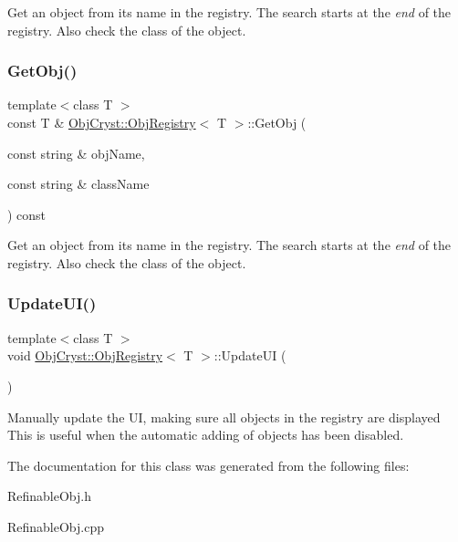 Get an object from its name in the registry. The search starts at the {\itshape end} of the registry. Also check the class of the object. \mbox{\label{class_obj_cryst_1_1_obj_registry_a1c6961905c0f6009b09dd6d79cabfbfa}} 
\subsubsection{\texorpdfstring{GetObj()}{GetObj()}\hspace{0.1cm}{\footnotesize\ttfamily [6/6]}}
{\footnotesize\ttfamily template$<$class T $>$ \\
const T \& \mbox{\hyperlink{class_obj_cryst_1_1_obj_registry}{Obj\+Cryst\+::\+Obj\+Registry}}$<$ T $>$\+::Get\+Obj (\begin{DoxyParamCaption}\item[{const string \&}]{obj\+Name,  }\item[{const string \&}]{class\+Name }\end{DoxyParamCaption}) const}

Get an object from its name in the registry. The search starts at the {\itshape end} of the registry. Also check the class of the object. \mbox{\label{class_obj_cryst_1_1_obj_registry_adac90a90cdee6d27cd5d9af917a86ab6}} 
\subsubsection{\texorpdfstring{UpdateUI()}{UpdateUI()}}
{\footnotesize\ttfamily template$<$class T $>$ \\
void \mbox{\hyperlink{class_obj_cryst_1_1_obj_registry}{Obj\+Cryst\+::\+Obj\+Registry}}$<$ T $>$\+::Update\+UI (\begin{DoxyParamCaption}{ }\end{DoxyParamCaption})}

Manually update the UI, making sure all objects in the registry are displayed This is useful when the automatic adding of objects has been disabled. 

The documentation for this class was generated from the following files\+:\begin{DoxyCompactItemize}
\item 
Refinable\+Obj.\+h\item 
Refinable\+Obj.\+cpp\end{DoxyCompactItemize}
